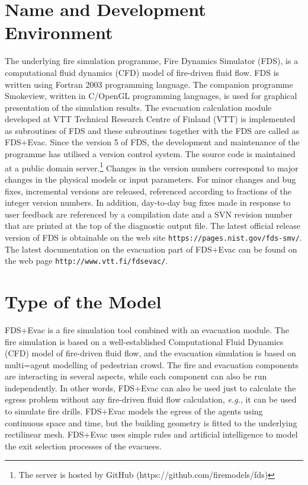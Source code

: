 \documentclass[12pt,a4paper,final,twoside]{stylevk}
\begin{document}
\section{Name and Development Environment}


\noindent The underlying fire simulation programme, Fire Dynamics
Simulator (FDS), is a computational fluid dynamics (CFD) model of
fire-driven fluid flow.  FDS is written using Fortran 2003 programming
language.  The companion programme Smokeview, written in C/OpenGL
programming languages, is used for graphical presentation of the
simulation results.  The evacuation calculation module developed at
VTT Technical Research Centre of Finland (VTT) is implemented as
subroutines of FDS and these subroutines together with the FDS are
called as FDS+Evac.  Since the version 5 of FDS, the development and
maintenance of the programme has utilised a version control system.
The source code is maintained at a public domain server.\footnote{The
  server is hosted by GitHub (https://github.com/firemodels/fds)}
Changes in the version numbers correspond to major changes in the
physical models or input parameters.  For minor changes and bug fixes,
incremental versions are released, referenced according to fractions
of the integer version numbers.  In addition, day-to-day bug fixes
made in response to user feedback are referenced by a compilation date
and a SVN revision number that are printed at the top of the
diagnostic output file.  The latest official release version of FDS is
obtainable on the web site {\tt https://pages.nist.gov/fds-smv/}.  The
latest documentation on the evacuation part of FDS+Evac can be found
on the web page {\tt http://www.vtt.fi/fdsevac/}.


\section{Type of the Model}

\noindent FDS+Evac is a fire simulation tool combined with an evacuation module.  
The fire simulation is based on a well-established Computational Fluid Dynamics 
(CFD) model of fire-driven fluid flow, and the evacuation simulation is based on multi=agent modelling of pedestrian crowd.  The fire and evacuation components are interacting in several aspects, while each component can also be run independently.  In other words, FDS+Evac can also be used just to calculate the egress problem without any fire-driven fluid flow calculation, \emph{e.g.}, it can be used to
simulate fire drills.  FDS+Evac models the egress of the agents using
continuous space and time, but the building geometry is fitted to the
underlying rectilinear mesh.  FDS+Evac uses simple rules and
artificial intelligence to model the exit selection processes of the
evacuees.
\end{document}
